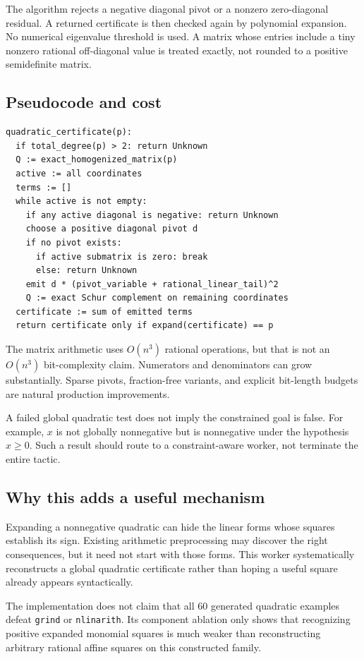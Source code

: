 \documentclass[11pt,a4paper]{article}
\theoremstyle{definition}
\newcommand{\grind}{\texttt{grind}}
\newcommand{\code}[1]{\texttt{#1}}
\begin{document}
The algorithm rejects a negative diagonal pivot or a nonzero zero-diagonal residual. A returned certificate is then checked again by polynomial expansion. No numerical eigenvalue threshold is used. A matrix whose entries include a tiny nonzero rational off-diagonal value is treated exactly, not rounded to a positive semidefinite matrix.

\subsection{Pseudocode and cost}

\begin{lstlisting}
quadratic_certificate(p):
  if total_degree(p) > 2: return Unknown
  Q := exact_homogenized_matrix(p)
  active := all coordinates
  terms := []
  while active is not empty:
    if any active diagonal is negative: return Unknown
    choose a positive diagonal pivot d
    if no pivot exists:
      if active submatrix is zero: break
      else: return Unknown
    emit d * (pivot_variable + rational_linear_tail)^2
    Q := exact Schur complement on remaining coordinates
  certificate := sum of emitted terms
  return certificate only if expand(certificate) == p
\end{lstlisting}

The matrix arithmetic uses $O(n^3)$ rational operations, but that is not an $O(n^3)$ bit-complexity claim. Numerators and denominators can grow substantially. Sparse pivots, fraction-free variants, and explicit bit-length budgets are natural production improvements.

A failed global quadratic test does not imply the constrained goal is false. For example, $x$ is not globally nonnegative but is nonnegative under the hypothesis $x\ge0$. Such a result should route to a constraint-aware worker, not terminate the entire tactic.

\subsection{Why this adds a useful mechanism}

Expanding a nonnegative quadratic can hide the linear forms whose squares establish its sign. Existing arithmetic preprocessing may discover the right consequences, but it need not start with those forms. This worker systematically reconstructs a global quadratic certificate rather than hoping a useful square already appears syntactically.

The implementation does not claim that all 60 generated quadratic examples defeat \grind{} or \code{nlinarith}. Its component ablation only shows that recognizing positive expanded monomial squares is much weaker than reconstructing arbitrary rational affine squares on this constructed family.
\end{document}
